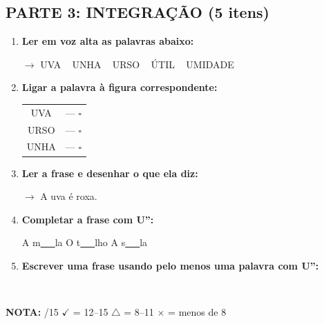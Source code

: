 \begin{exercicio}
\subsection*{PARTE 3: INTEGRAÇÃO (5 itens)}

\begin{enumerate}[resume]
  \item \textbf{Ler em voz alta as palavras abaixo:}
  \begin{center}
  $\rightarrow$ UVA  ~  UNHA  ~  URSO  ~  ÚTIL  ~  UMIDADE
  \end{center}

  \item \textbf{Ligar a palavra à figura correspondente:}
  \begin{center}
  \begin{tabular}{cc}
  UVA & \quad --- \quad $\square$ \\
  URSO & \quad --- \quad $\square$ \\
  UNHA & \quad --- \quad $\square$
  \end{tabular}
  \end{center}

  \item \textbf{Ler a frase e desenhar o que ela diz:}
  \begin{center}
  $\rightarrow$ A uva é roxa.
  \end{center}
  \begin{center}
  \end{center}

  \item \textbf{Completar a frase com U'':}
  \begin{center}
  A m\underline{~~~}la \quad O t\underline{~~~}lho \quad A s\underline{~~~}la
  \end{center}

  \item \textbf{Escrever uma frase usando pelo menos uma palavra com U'':}
  \begin{center}
  \underline{\hspace{12cm}} \\
  \underline{\hspace{12cm}}
  \end{center}
\end{enumerate}

\noindent\textbf{NOTA:} \underline{\hspace{1cm}}/15 \quad $\checkmark$ = 12--15 \quad $\triangle$ = 8--11 \quad $\times$ = menos de 8
\end{exercicio}

